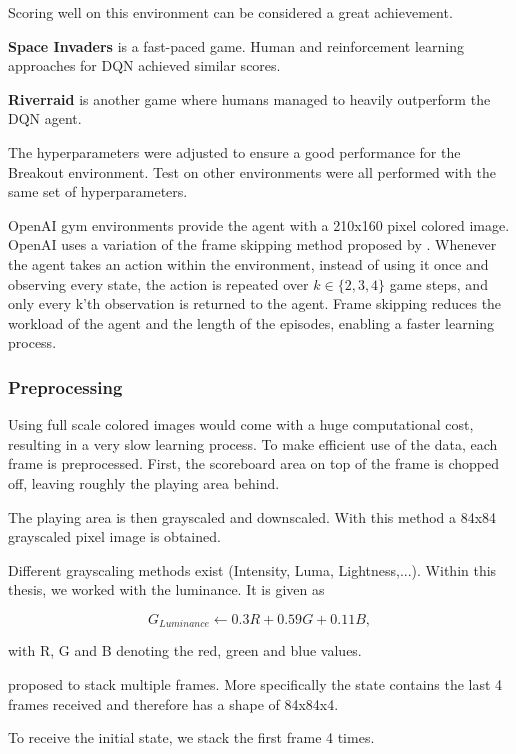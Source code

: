 Scoring well on this environment can be considered a great achievement.

\textbf{Space Invaders} is a fast-paced game. Human and reinforcement learning approaches for DQN achieved similar scores. \citep{mnih2015atari}

\textbf{Riverraid} is another game where humans managed to heavily outperform the DQN agent.

The hyperparameters were adjusted to ensure a good performance for the Breakout environment. Test on other environments were all performed with the same set of hyperparameters.


OpenAI gym environments provide the agent with a 210x160 pixel colored image. \linebreak
OpenAI uses a variation of the frame skipping method proposed by \citet{nature}.
Whenever the agent takes an action within the environment, instead of using it once and observing every state, the action is repeated over $k \in \{2,3,4\}$ game steps, and only every k'th observation is returned to the agent. Frame skipping reduces the workload of the agent and the length of the episodes, enabling a faster learning process.


\subsubsection{Preprocessing}
Using full scale colored images would come with a huge computational cost, resulting in a very slow learning process.
To make efficient use of the data, each frame is preprocessed.
First, the scoreboard area on top of the frame is chopped off, leaving roughly the playing area behind.

The playing area is then grayscaled and downscaled. With this method a 84x84 grayscaled pixel image is obtained.

Different grayscaling methods exist (Intensity, Luma, Lightness,...). Within this thesis, we worked with the luminance. It is given as

\begin{equation}
G_{Luminance} \gets 0.3 R + 0.59 G + 0.11 B,
\end{equation}

with R, G and B denoting the red, green and blue values.

\citet{nature} proposed to stack multiple frames. More specifically the state contains the last 4 frames received and therefore has a shape of 84x84x4.

To receive the initial state, we stack the first frame 4 times.

